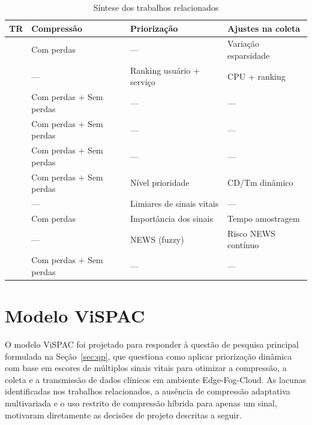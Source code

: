 \documentclass[twoside,english,brazilian]{UNISINOSmonografia}
\begin{document}
\begin{table}[ht]
\centering
\caption{Síntese dos trabalhos relacionados}
\label{tab:sintese-estado-arte}
\begin{tabular}{|p{3cm}|p{4cm}|p{4cm}|p{4cm}|}
\hline
\textbf{TR} & \textbf{Compressão} & \textbf{Priorização} & \textbf{Ajustes na coleta} \\ \hline
\cite{ESMAEILI2023} & Com perdas              & —   & Variação esparsidade \\ \hline
\cite{CASSEL2024}   & —   & Ranking usuário + serviço & CPU + ranking \\ \hline
\cite{Chang2024}    & Com perdas + Sem perdas & —  & —  \\ \hline
\cite{Hassan2024}   & Com perdas + Sem perdas & —  & —  \\ \hline
\cite{Vakil2024}    & Com perdas + Sem perdas & —  & —  \\ \hline
\cite{Andrade2025}  & Com perdas + Sem perdas & Nível prioridade & CD/Tm dinâmico \\ \hline
\cite{MOHAPATRA2025}& —                       & Limiares de sinais vitais & —  \\ \hline
\cite{TAO2025}      & Com perdas              & Importância dos sinais & Tempo amostragem \\ \hline
\cite{Shankani2025} & —                       & NEWS (fuzzy) & Risco NEWS contínuo \\ \hline
\cite{Zhou2025}     & Com perdas + Sem perdas & —   & —  \\ \hline
\end{tabular}
\end{table}

\chapter{Modelo ViSPAC}
\label{cap:modelo}
O modelo ViSPAC foi projetado para responder à questão de pesquisa principal formulada na Seção~\ref{sec:qp}, que questiona como aplicar priorização dinâmica com base em escores de múltiplos sinais vitais para otimizar a compressão, a coleta e a transmissão de dados clínicos em ambiente Edge-Fog-Cloud. As lacunas identificadas nos trabalhos relacionados, a ausência de compressão adaptativa multivariada e o uso restrito de compressão híbrida para apenas um sinal, motivaram diretamente as decisões de projeto descritas a seguir.
\end{document}
